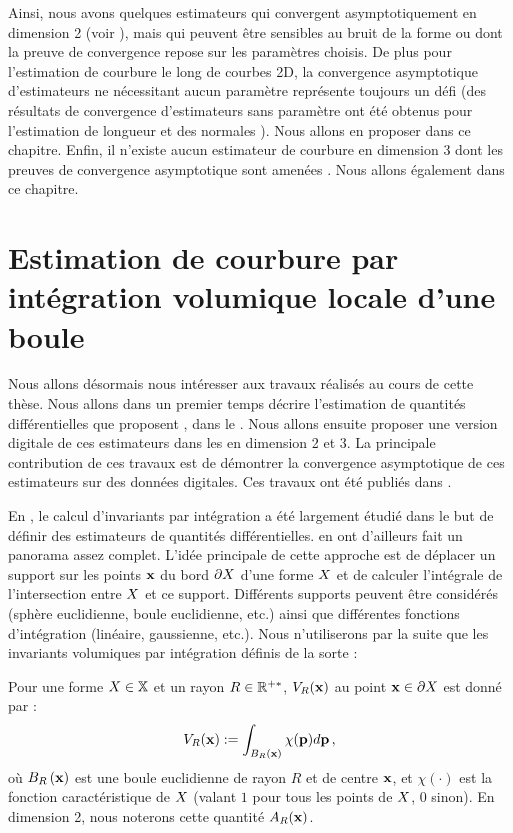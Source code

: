 Ainsi, nous avons quelques estimateurs qui convergent asymptotiquement en
dimension 2 (voir ), mais qui peuvent être sensibles au
bruit de la forme ou dont la preuve de convergence repose sur les paramètres
choisis. De plus pour l'estimation de courbure le long de courbes 2D, la
convergence asymptotique d'estimateurs ne nécessitant aucun paramètre représente
toujours un défi (des résultats de convergence d'estimateurs sans paramètre ont
été obtenus pour l'estimation de longueur \cite{Coeurjolly2004} et des normales
\cite{deVieilleville2007}). Nous allons en proposer dans ce chapitre. Enfin, il
n'existe aucun estimateur de courbure en dimension 3 dont les preuves de
convergence asymptotique sont amenées \cite{Lenoir1997,Fourey2008}. Nous allons également
 dans ce chapitre.

\section{Estimation de courbure par intégration volumique locale d'une boule}
\label{sec:estimators:volume}
%
Nous allons désormais nous intéresser aux travaux réalisés au cours de cette
thèse. Nous allons dans un premier temps décrire l'estimation de quantités
différentielles que proposent ,
dans le . Nous allons ensuite proposer une
version digitale de ces estimateurs dans les 
en dimension 2 et 3. La principale contribution de ces travaux est de démontrer
la convergence asymptotique de ces estimateurs sur des données digitales. Ces
travaux ont été publiés dans \cite{DGCI2013,CVIU2014}.

En \GeometryProcessing, le calcul d'invariants par intégration a été largement
étudié dans le but de définir des estimateurs de quantités différentielles.
 en ont d'ailleurs fait un
panorama assez complet. L'idée principale de cette approche est de déplacer un support
sur les points $\mathbf{x}$ du bord $\partial X$ d'une forme $X$ et de calculer
l'intégrale de l'intersection entre $X$ et ce support. Différents supports
peuvent être considérés (sphère euclidienne, boule euclidienne, etc.) ainsi que
différentes fonctions d'intégration (linéaire, gaussienne, etc.). Nous
n'utiliserons par la suite que les invariants volumiques par intégration définis
de la sorte :
%
\begin{definition}
  \label{def:Volume}
  Pour une forme $X \in \mathbb{X}$ et un rayon $R \in \mathbb{R}^{+*}$,  $V_R(\mathbf{x})$ au point $\mathbf{x} \in \partial X$ est donné par :
  \begin{equation}
    V_R(\mathbf{x}) := \int_{B_{R}\left(\mathbf{x}\right)} \chi(\mathbf{p})d\mathbf{p}\,,
  \end{equation}
  où $B_{R}\left(\mathbf{x}\right)$ est une boule euclidienne de rayon $R$ et de centre $\mathbf{x}$,
  et $\chi(\cdot)$ est la fonction caractéristique de $X$ (valant $1$ pour
  tous les points de $X$, $0$ sinon). En dimension 2, nous noterons cette
  quantité $A_R(\mathbf{x})$.
\end{definition}
%
